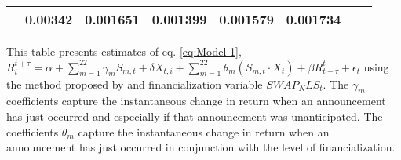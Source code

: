 \begin{sidewaystable}
{\begin{tabular}{@{}lllllllllllll@{}}
                              & \multicolumn{2}{c}{ 0.00342 }                                                 & \multicolumn{2}{c}{ 0.001651 }                                                 & \multicolumn{2}{c}{ 0.001399 }                                                 & \multicolumn{2}{c}{ 0.001579 }                                                   & \multicolumn{2}{c}{ 0.001734 }                                                 \\ \bottomrule 
\end{tabular}
}
\begin{tablenotes}\item 
    \singlespacing
    \footnotesize
    This table presents estimates of eq. \ref{eq:Model 1}, $R_{t}^{t+\tau}=\alpha+\sum_{m=1}^{22} \gamma_m S_{m,t}+ \delta X_{t,i} + \sum_{m=1}^{22} \theta_m (S_{m,t} \cdot X_t)+\beta R_{t-\tau}^{t}+\epsilon_{t}$ using the method proposed by \citet{kurov2019price} and financialization variable $SWAP_NLS_t$. The $\gamma_m$ coefficients capture the instantaneous change in return when an announcement has just occurred and especially if that announcement was unanticipated. The coefficients $\theta_m$ capture the instantaneous change in return when an announcement has just occurred in conjunction with the level of financialization.
\end{tablenotes}
\end{sidewaystable}

